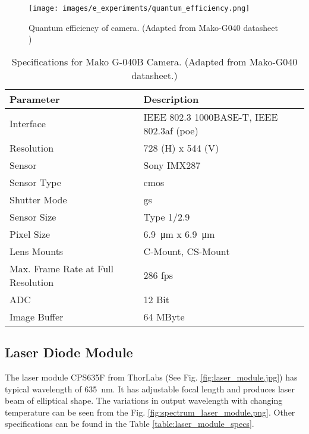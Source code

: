     \clearpage
    
    \begin{figure}[ht]
        \centering
        \texttt{[image: images/e\_experiments/quantum\_efficiency.png]}
        \caption{Quantum efficiency of camera. (Adapted from Mako-G040 datasheet \cite{mako_camera})}
        \label{fig:quantum_efficiency.png}
    \end{figure}

    \begin{table}
        \centering
        \footnotesize
        \renewcommand{\arraystretch}{1.2}
        \begin{tabular}{p{6cm}p{7cm}}
            \toprule
            \textbf{Parameter} & \textbf{Description} \\
            \midrule
            Interface & IEEE 802.3 1000BASE-T, IEEE 802.3af (\gls{poe})\\
            Resolution & 728 (H) x 544 (V)\\
            Sensor & Sony IMX287\\
            Sensor Type & \gls{cmos}\\
            Shutter Mode & \gls{gs}\\
            Sensor Size & Type 1/2.9\\
            Pixel Size & \SI{6.9}{\micro\meter} x \SI{6.9}{\micro\meter}\\
            Lens Mounts & C-Mount, CS-Mount\\
            Max. Frame Rate at Full Resolution & 286 \gls{fps}\\
            ADC & 12 Bit\\
            Image Buffer & 64 MByte\\
            \bottomrule
        \end{tabular}
        \caption{Specifications for Mako G-040B Camera. (Adapted from Mako-G040 datasheet.\cite{mako_camera})}
        \label{table:camera_specs}
    \end{table}
    
\subsection{Laser Diode Module}
    The laser module CPS635F from ThorLabs (See Fig. \ref{fig:laser_module.jpg}) has typical wavelength of \SI{635}{\nano\meter}. It has adjustable focal length and produces laser beam of elliptical shape. The variations in output wavelength with changing temperature can be seen from the Fig. \ref{fig:spectrum_laser_module.png}. Other specifications can be found in the Table \ref{table:laser_module_specs}.

